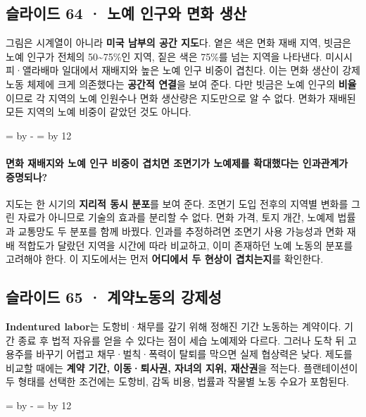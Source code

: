 \documentclass[10pt,a4paper]{article}
\newcommand{\ReserveQuestionSpace}{%
  \par\begingroup
  \dimen0=\pagegoal \advance\dimen0 by -\pagetotal
  \dimen2=\baselineskip \multiply\dimen2 by 12
  \ifdim\dimen0<\dimen2 \newpage\fi
  \endgroup}
\begin{document}
\subsection{슬라이드 64 · 노예 인구와 면화 생산}
그림은 시계열이 아니라 \textbf{미국 남부의 공간 지도}다. 옅은 색은 면화 재배 지역, 빗금은 노예 인구가 전체의 50\textasciitilde{}75\%인 지역, 짙은 색은 75\%를 넘는 지역을 나타낸다. 미시시피·앨라배마 일대에서 재배지와 높은 노예 인구 비중이 겹친다. 이는 면화 생산이 강제노동 체제에 크게 의존했다는 \textbf{공간적 연결}을 보여 준다. 다만 빗금은 노예 인구의 \textbf{비율}이므로 각 지역의 노예 인원수나 면화 생산량은 지도만으로 알 수 없다. 면화가 재배된 모든 지역의 노예 비중이 같았던 것도 아니다.\par

\ReserveQuestionSpace
\paragraph{면화 재배지와 노예 인구 비중이 겹치면 조면기가 노예제를 확대했다는 인과관계가 증명되나?}
지도는 한 시기의 \textbf{지리적 동시 분포}를 보여 준다. 조면기 도입 전후의 지역별 변화를 그린 자료가 아니므로 기술의 효과를 분리할 수 없다. 면화 가격, 토지 개간, 노예제 법률과 교통망도 두 분포를 함께 바꿨다. 인과를 추정하려면 조면기 사용 가능성과 면화 재배 적합도가 달랐던 지역을 시간에 따라 비교하고, 이미 존재하던 노예 노동의 분포를 고려해야 한다. 이 지도에서는 먼저 \textbf{어디에서 두 현상이 겹치는지}를 확인한다.\par

\subsection{슬라이드 65 · 계약노동의 강제성}
\textbf{Indentured labor}는 도항비·채무를 갚기 위해 정해진 기간 노동하는 계약이다. 기간 종료 후 법적 자유를 얻을 수 있다는 점이 세습 노예제와 다르다. 그러나 도착 뒤 고용주를 바꾸기 어렵고 채무·벌칙·폭력이 탈퇴를 막으면 실제 협상력은 낮다. 제도를 비교할 때에는 \textbf{계약 기간, 이동·퇴사권, 자녀의 지위, 재산권}을 적는다. 플랜테이션이 두 형태를 선택한 조건에는 도항비, 감독 비용, 법률과 작물별 노동 수요가 포함된다.\par

\ReserveQuestionSpace
\end{document}
